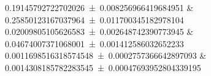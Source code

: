 \num{0.19145792722702026 \pm 0.008256966419684951}		&		\num{0.25850123167037964 \pm 0.011700345182978104}	 \\ 
\num{0.02009805105626583 \pm 0.002648742390773945}		&		\num{0.04674007371068001 \pm 0.001412586032652233}	 \\ 
\num{0.0011698516318574548 \pm 0.0002757366642897093}		&		\num{0.0014308185782283545 \pm 0.00047693952804339195}	 \\ 

